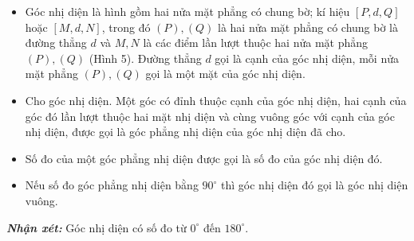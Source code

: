 \documentclass[12pt,a4paper]{extarticle}
\begin{document}
\begin{minipage}{0.55\textwidth}
	\begin{itemize}
		\item Góc nhị diện là hình gồm hai nửa mặt phẳng có chung bờ; kí hiệu $[P, d, Q]$ hoặc $[M, d, N]$, trong đó $(P), (Q)$ là hai nửa mặt phẳng có chung bờ là đường thẳng $d$ và $M, N$ là các điểm lần lượt thuộc hai nửa mặt phẳng $(P), (Q)$ (Hình 5). Đường thẳng $d$ gọi là cạnh của góc nhị diện, mỗi nửa mặt phẳng $(P), (Q)$ gọi là một mặt của góc nhị diện.
		\item Cho góc nhị diện. Một góc có đỉnh thuộc cạnh của góc nhị diện, hai cạnh của góc đó lần lượt thuộc hai mặt nhị diện và cùng vuông góc với cạnh của góc nhị diện, được gọi là góc phẳng nhị diện của góc nhị diện đã cho.
		\item Số đo của một góc phẳng nhị diện được gọi là số đo của góc nhị diện đó.
		\item Nếu số đo góc phẳng nhị diện bằng $90^\circ$ thì góc nhị diện đó gọi là góc nhị diện vuông.
	\end{itemize}
	\textbf{\textit{Nhận xét:}} Góc nhị diện có số đo từ $0^\circ$ đến $180^\circ$.
\end{minipage}
\hfill
\end{document}
